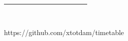 \documentclass[12pt,landscape]{report}
\begin{document}
\begin{tabular}{@{}|c!{\vrule width 1.25pt}c|c|c|c|c|c|@{}}
\\ \hline
%
 &

~ &                                                                         %
~ &                                                                         %
~ &                                                                         %
~ &                                                                         %
~ &                                                                         %
~                                                                           %

\\ \hline

\end{tabular}

\vfill\hfill{\color{gray!50}\scriptsize https://github.com/xtotdam/timetable}
\end{document}
